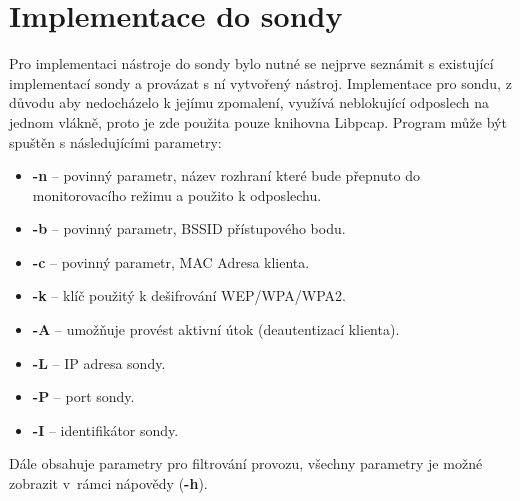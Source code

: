 \section{Implementace do sondy}
Pro implementaci nástroje do sondy bylo nutné se nejprve seznámit s existující implementací sondy a provázat s ní vytvořený nástroj. Implementace pro sondu, z důvodu aby nedocházelo k jejímu zpomalení, využívá neblokující odposlech na jednom vlákně, proto je zde použita pouze knihovna Libpcap. Program může být spuštěn s následujícími parametry:
\begin{itemize}
  \item{\textbf{-n} -- povinný parametr, název rozhraní které bude přepnuto do monitorovacího režimu a použito k odposlechu.}
  \item{\textbf{-b} -- povinný parametr, BSSID přístupového bodu.}
  \item{\textbf{-c} -- povinný parametr, MAC Adresa klienta.}
  \item{\textbf{-k} -- klíč použitý k dešifrování WEP/WPA/WPA2.}
  \item{\textbf{-A} -- umožňuje provést aktivní útok (deautentizací klienta).}
  \item{\textbf{-L} -- IP adresa sondy.}
  \item{\textbf{-P} -- port sondy.}
  \item{\textbf{-I} -- identifikátor sondy.}
\end{itemize}
Dále obsahuje parametry pro filtrování provozu, všechny parametry je možné zobrazit v~rámci nápovědy (\textbf{-h}).

